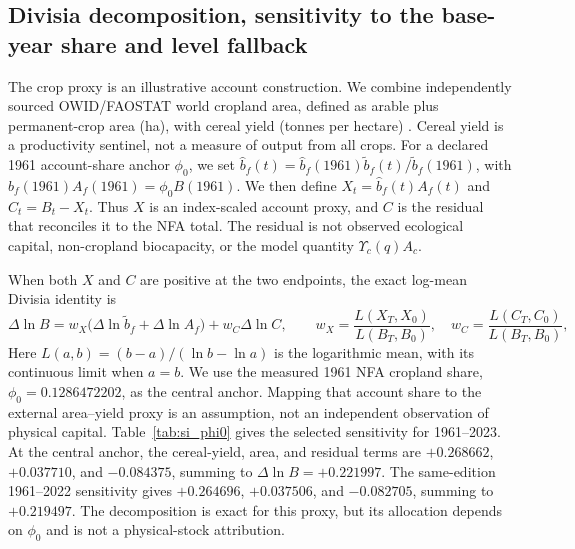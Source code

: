 \documentclass[11pt,a4paper]{article}
\newcommand{\Ups}{\Upsilon_c}
\begin{document}
\newpage
\subsection{Divisia decomposition, sensitivity to the base-year share and level fallback}\label{si:divisia}

The crop proxy is an illustrative account construction. We combine independently sourced OWID/FAOSTAT world cropland area, defined as arable plus permanent-crop area (ha), with cereal yield (tonnes per hectare) \citep{OWIDCropland2026,OWIDCereal2026}. Cereal yield is a productivity sentinel, not a measure of output from all crops. For a declared 1961 account-share anchor $\phi_0$, we set $\hat b_f(t)=\hat b_f(1961)\tilde b_f(t)/\tilde b_f(1961)$, with $\hat b_f(1961)A_f(1961)=\phi_0B(1961)$. We then define $X_t=\hat b_f(t)A_f(t)$ and $C_t=B_t-X_t$. Thus $X$ is an index-scaled account proxy, and $C$ is the residual that reconciles it to the NFA total. The residual is not observed ecological capital, non-cropland biocapacity, or the model quantity $\Ups(q)A_c$.

When both $X$ and $C$ are positive at the two endpoints, the exact log-mean Divisia identity is
\begin{equation}
\Delta\ln B=w_X\bigl(\Delta\ln\tilde b_f+\Delta\ln A_f\bigr)+w_C\Delta\ln C,
\qquad w_X=\frac{L(X_T,X_0)}{L(B_T,B_0)},\quad w_C=\frac{L(C_T,C_0)}{L(B_T,B_0)},
\end{equation}
Here $L(a,b)=(b-a)/(\ln b-\ln a)$ is the logarithmic mean, with its continuous limit when $a=b$. We use the measured 1961 NFA cropland share, $\phi_0=0.1286472202$, as the central anchor. Mapping that account share to the external area--yield proxy is an assumption, not an independent observation of physical capital. Table~\ref{tab:si_phi0} gives the selected sensitivity for 1961--2023. At the central anchor, the cereal-yield, area, and residual terms are $+0.268662$, $+0.037710$, and $-0.084375$, summing to $\Delta\ln B=+0.221997$. The same-edition 1961--2022 sensitivity gives $+0.264696$, $+0.037506$, and $-0.082705$, summing to $+0.219497$. The decomposition is exact for this proxy, but its allocation depends on $\phi_0$ and is not a physical-stock attribution.
\end{document}
